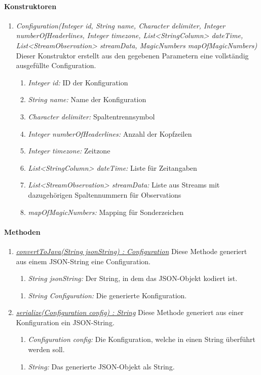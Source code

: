 \paragraph{Konstruktoren}
\begin{enumerate}[+]
	\item \textit{Configuration(Integer id, String name, Character delimiter, Integer numberOfHeaderlines, Integer timezone, List<StringColumn> dateTime, List<StreamObservation> streamData, MagicNumbers mapOfMagicNumbers)} Dieser Konstruktor erstellt aus den gegebenen Parametern eine vollständig ausgefüllte Configuration.
	\begin{enumerate}[$\bullet$]
		\item \textit{Integer id:} ID der Konfiguration
		\item \textit{String name:} Name der Konfiguration
		\item \textit{Character delimiter:} Spaltentrennsymbol
		\item \textit{Integer numberOfHeaderlines:} Anzahl der Kopfzeilen
		\item \textit{Integer timezone:} Zeitzone
		\item \textit{List<StringColumn> dateTime:} Liste für Zeitangaben
		\item \textit{List<StreamObservation> streamData:} Liste aus Streams mit dazugehörigen Spaltennummern für Observations
		\item \textit{mapOfMagicNumbers:} Mapping für Sonderzeichen
	\end{enumerate}
\end{enumerate}

\paragraph{Methoden}
\begin{enumerate}[+]
	\item \textit{\underline{convertToJava(String jsonString) : Configuration}} Diese Methode generiert aus einem JSON-String eine Configuration.
	\begin{enumerate}[$\bullet$]
		\item \textit{String jsonString:} Der String, in dem das JSON-Objekt kodiert ist.
	\end{enumerate}
	\begin{enumerate}[$\circ$]
		\item \textit{String Configuration:} Die generierte Konfiguration.
	\end{enumerate}
	
	\item \textit{\underline{serialize(Configuration config) : String}} Diese Methode generiert aus einer Konfiguration ein JSON-String.
	\begin{enumerate}[$\bullet$]
		\item \textit{Configuration config:} Die Konfiguration, welche in einen String überführt werden soll.
	\end{enumerate}
	\begin{enumerate}[$\circ$]
		\item \textit{String:} Das generierte JSON-Objekt als String.
	\end{enumerate}
\end{enumerate}
